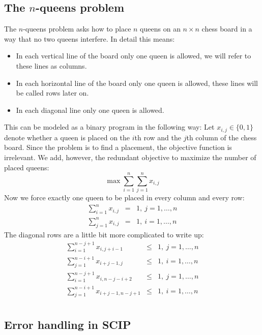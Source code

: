 \documentclass[a4paper]{article}
\begin{document}
\subsection{The $n$-queens problem}

The $n$-queens problem asks how to place $n$ queens on an $n \times n$ chess board in a way that no two queens interfere. In detail this means:
\begin{itemize}
\item In each vertical line of the board only one queen is allowed, we will refer to these lines as columns.
\item In each horizontal line of the board only one queen is allowed, these lines will be called rows later on.
\item In each diagonal line only one queen is allowed.
\end{itemize}
This can be modeled as a binary program in the following way: Let $x_{i,j} \in \{0,1\}$ denote whether a queen 
is placed on the $i$th row and the $j$th column of the chess board. Since the problem is to find a placement, 
the objective function is irrelevant. We add, however, the redundant objective to maximize the number of placed queens:
\[
\max \sum_{i=1}^n \sum_{j=1}^n x_{i,j}
\]
Now we force exactly one queen to be placed in every column and every row:
\begin{eqnarray*}
  \sum_{i=1}^n x_{i,j} & = & 1, \ j=1,\ldots,n \\
  \sum_{j=1}^n x_{i,j} & = & 1, \ i=1,\ldots,n
\end{eqnarray*}
The diagonal rows are a little bit more complicated to write up:
\begin{eqnarray*}
  \sum_{i=1}^{n-j+1} x_{i,j+i-1} & \leq & 1, \ j = 1, \ldots, n \\
  \sum_{j=1}^{n-i+1} x_{i+j-1,j} & \leq & 1, \ i = 1, \ldots, n \\
  \sum_{i=1}^{n-j+1} x_{i,n-j-i+2} & \leq & 1, \ j = 1, \ldots, n\\
  \sum_{j=1}^{n-i+1} x_{i+j-1,n-j+1} & \leq & 1, \ i = 1, \ldots, n\\
\end{eqnarray*}

\subsection{Error handling in SCIP}
\end{document}
